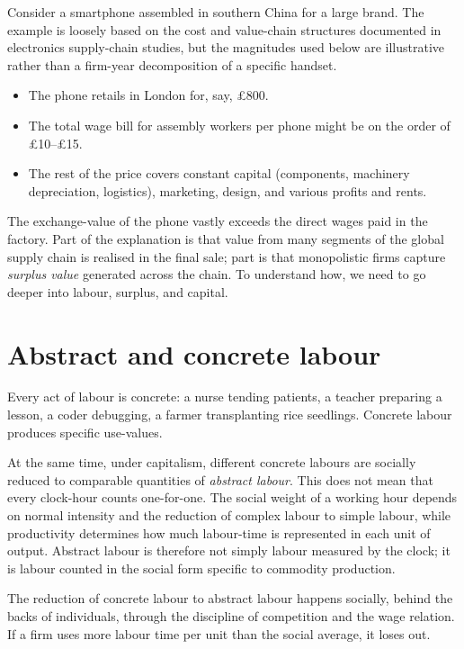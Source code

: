 Consider a smartphone assembled in southern China for a large brand. The example is loosely based on the cost and value-chain structures documented in electronics supply-chain studies, but the magnitudes used below are illustrative rather than a firm-year decomposition of a specific handset.\cite{DedrickKraemerLinden2010,Smith2016}
\begin{itemize}[leftmargin=1.5em]
  \item The phone retails in London for, say, \pounds800.
  \item The total wage bill for assembly workers per phone might be on the
  order of \pounds10--\pounds15.
  \item The rest of the price covers constant capital (components, machinery
  depreciation, logistics), marketing, design, and various profits and rents.
\end{itemize}

The exchange-value of the phone vastly exceeds the direct wages paid in the
factory. Part of the explanation is that value from many segments of the
global supply chain is realised in the final sale; part is that monopolistic
firms capture \emph{surplus value} generated across the chain. To understand
how, we need to go deeper into labour, surplus, and capital.

\section{Abstract and concrete labour}
\label{sec:abstract-concrete}

Every act of labour is concrete: a nurse tending patients, a teacher
preparing a lesson, a coder debugging, a farmer transplanting rice seedlings.
Concrete labour produces specific use-values.

At the same time, under capitalism, different concrete labours are socially reduced to
comparable quantities of \emph{abstract labour}. This does not mean that every clock-hour
counts one-for-one. The social weight of a working hour depends on normal intensity and
the reduction of complex labour to simple labour, while productivity determines how much
labour-time is represented in each unit of output. Abstract labour is therefore not simply
labour measured by the clock; it is labour counted in the social form specific to commodity
production.

The reduction of concrete labour to abstract labour happens socially, behind
the backs of individuals, through the discipline of competition and the
wage relation. If a firm uses more labour time per unit than the social
average, it loses out.

